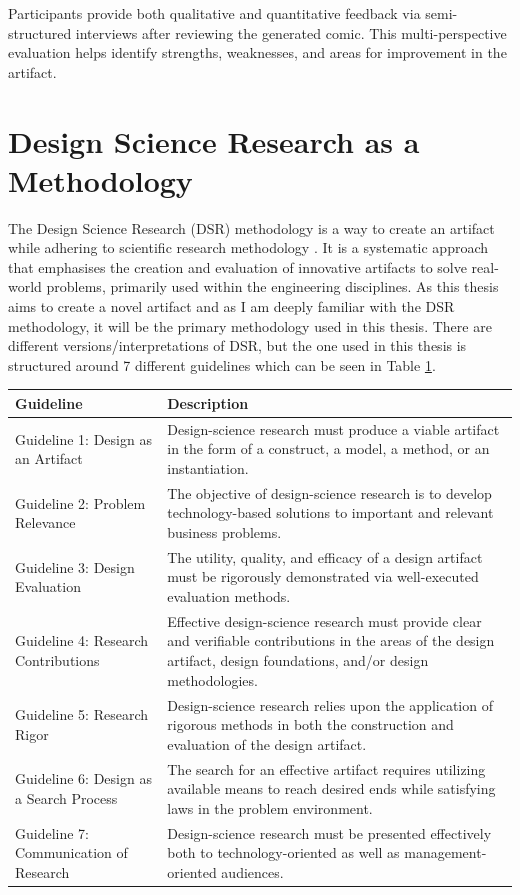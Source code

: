 Participants provide both qualitative and quantitative feedback via semi-structured interviews after reviewing the generated comic. This multi-perspective evaluation helps identify strengths, weaknesses, and areas for improvement in the artifact.

\section{Design Science Research as a Methodology}
The Design Science Research (DSR) methodology is a way to create an artifact while adhering to scientific research methodology \cite{dresch2015design}. It is a systematic approach that emphasises the creation and evaluation of innovative artifacts to solve real-world problems, primarily used within the engineering disciplines. As this thesis aims to create a novel artifact and as I am deeply familiar with the DSR methodology, it will be the primary methodology used in this thesis. There are different versions/interpretations of DSR, but the one used in this thesis is structured around 7 different guidelines \cite{hevner2004design} which can be seen in Table \ref{tab:DSRGuidelines}.

\begin{table}[htbp]
\centering
\small
\begin{tabular}{|l|p{7.2cm}|}
\hline
\textbf{Guideline} & \textbf{Description} \\
\hline
Guideline 1: Design as an Artifact & Design-science research must produce a viable artifact in the form of a construct, a model, a method, or an instantiation. \\
\hline
Guideline 2: Problem Relevance & The objective of design-science research is to develop technology-based solutions to important and relevant business problems. \\
\hline
Guideline 3: Design Evaluation & The utility, quality, and efficacy of a design artifact must be rigorously demonstrated via well-executed evaluation methods. \\
\hline
Guideline 4: Research Contributions & Effective design-science research must provide clear and verifiable contributions in the areas of the design artifact, design foundations, and/or design methodologies. \\
\hline
Guideline 5: Research Rigor & Design-science research relies upon the application of rigorous methods in both the construction and evaluation of the design artifact. \\
\hline
Guideline 6: Design as a Search Process & The search for an effective artifact requires utilizing available means to reach desired ends while satisfying laws in the problem environment. \\
\hline
Guideline 7: Communication of Research & Design-science research must be presented effectively both to technology-oriented as well as management-oriented audiences. \\
\hline
\end{tabular}
 \label{tab:DSRGuidelines}
\end{table}

